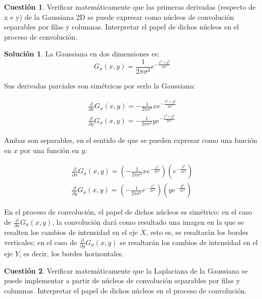 \documentclass[a4paper, 11pt]{article}
\theoremstyle{definition}
\newtheorem*{solucion}{Solución}
\theoremstyle{theorem}
\newtheorem{cuestion}{Cuestión}
\begin{document}
  \begin{cuestion}
      Verificar matemáticamente que las primeras derivadas (respecto de x e y) de la Gaussiana 2D se puede expresar como núcleos de convolución separables por filas y columnas. Interpretar el papel de dichos núcleos en el proceso de convolución.
  \end{cuestion}
  \begin{solucion}
      La Gaussiana en dos dimensiones es:
      \[
      G_\sigma(x,y) = \frac{1}{2\pi\sigma^2}e^{-\frac{x^2+y^2}{2\sigma^2}}
      \]

      Sus derivadas parciales son simétricas por serlo la Gaussiana:

      \begin{align*}
          \frac{\partial}{\partial x} G_\sigma(x,y) = -\frac{1}{2\pi\sigma^4}xe^{-\frac{x^2+y^2}{2\sigma^2}} \\
          \frac{\partial}{\partial y} G_\sigma(x,y) = -\frac{1}{2\pi\sigma^4}ye^{-\frac{x^2+y^2}{2\sigma^2}}
      \end{align*}

      Ambas son separables, en el sentido de que se pueden expresar como una función en $x$ por una función en $y$:

      \begin{align*}
          \frac{\partial}{\partial x} G_\sigma(x,y) = \left(-\frac{1}{2\pi\sigma^4}xe^{-\frac{x^2}{2\sigma^2}}\right)\left(e^{-\frac{y^2}{2\sigma^2}}\right) \\
          \frac{\partial}{\partial y} G_\sigma(x,y) = \left(-\frac{1}{2\pi\sigma^4}e^{-\frac{x^2}{2\sigma^2}}\right)\left(ye^{-\frac{y^2}{2\sigma^2}}\right)
      \end{align*}

      En el proceso de convolución, el papel de dichos núcleos es simétrico: en el caso de $\frac{\partial}{\partial x} G_\sigma(x,y)$, la convolución dará como resultado una imagen en la que se resalten los cambios de intensidad en el eje $X$, esto es, se resaltarán los bordes verticales; en el caso de $\frac{\partial}{\partial y} G_\sigma(x,y)$ se resaltarán los cambios de intensidad en el eje $Y$, es decir, los bordes horizontales.

  \end{solucion}

  \begin{cuestion}
      Verificar matemáticamente que la Laplaciana de la Gaussiana se puede implementar a partir de núcleos de convolución separables por filas y columnas. Interpretar el papel de dichos núcleos en el proceso de convolución.
  \end{cuestion}
\end{document}

